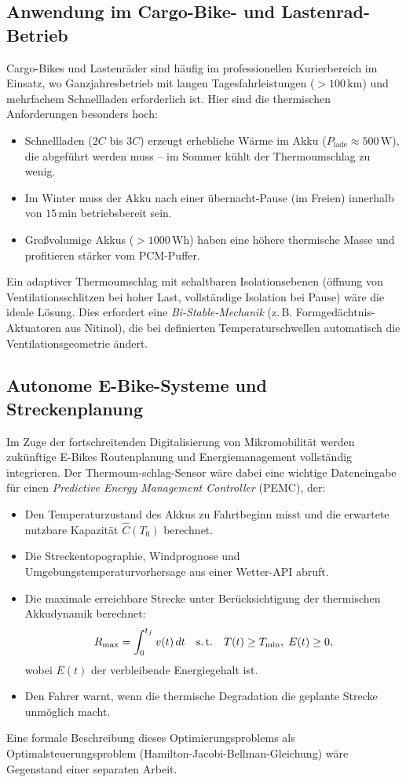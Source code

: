 ﻿\documentclass[a4paper,12pt]{article}
\theoremstyle{definition}
\begin{document}
\subsection{Anwendung im Cargo-Bike- und Lastenrad-Betrieb}

Cargo-Bikes und Lastenr\"ader sind h\"aufig im professionellen Kurierbereich im Einsatz, wo Ganzjahresbetrieb mit langen Tagesfahrleistungen ($> 100\,\mathrm{km}$) und mehrfachem Schnellladen erforderlich ist. Hier sind die thermischen Anforderungen besonders hoch:
\begin{itemize}
  \item Schnellladen ($2C$ bis $3C$) erzeugt erhebliche W\"arme im Akku ($P_\mathrm{lade} \approx 500\,\mathrm{W}$), die abgef\"uhrt werden muss -- im Sommer k\"uhlt der Thermoumschlag zu wenig.
  \item Im Winter muss der Akku nach einer \"ubernacht-Pause (im Freien) innerhalb von $15\,\mathrm{min}$ betriebsbereit sein.
  \item Gro\ss{}volumige Akkus ($> 1000\,\mathrm{Wh}$) haben eine h\"ohere thermische Masse und profitieren st\"arker vom PCM-Puffer.
\end{itemize}
Ein adaptiver Thermoumschlag mit schaltbaren Isolationsebenen (\"offnung von Ventilationsschlitzen bei hoher Last, vollst\"andige Isolation bei Pause) w\"are die ideale L\"osung. Dies erfordert eine \emph{Bi-Stable-Mechanik} (z.\,B. Formged\"achtnis-Aktuatoren aus Nitinol), die bei definierten Temperaturschwellen automatisch die Ventilationsgeometrie \"andert.

\subsection{Autonome E-Bike-Systeme und Streckenplanung}

Im Zuge der fortschreitenden Digitalisierung von Mikromobilit\"at werden zuk\"unftige E-Bikes Routenplanung und Energiemanagement vollst\"andig integrieren. Der Thermoum-\newline schlag-Sensor w\"are dabei eine wichtige Dateneingabe f\"ur einen \emph{Predictive Energy Management Controller} (PEMC), der:
\begin{itemize}
  \item Den Temperaturzustand des Akkus zu Fahrtbeginn misst und die erwartete nutzbare Kapazit\"at $\hat{C}(T_0)$ berechnet.
  \item Die Streckentopographie, Windprognose und Umgebungstemperaturvorhersage aus einer Wetter-API abruft.
  \item Die maximale erreichbare Strecke unter Ber\"ucksichtigung der thermischen Akkudynamik berechnet:
  \[
    R_\mathrm{max} = \int_0^{t_f} v(t)\,dt \quad \text{s.\,t.} \quad T(t) \geq T_\mathrm{min},\; E(t) \geq 0,
  \]
  wobei $E(t)$ der verbleibende Energiegehalt ist.
  \item Den Fahrer warnt, wenn die thermische Degradation die geplante Strecke unm\"oglich macht.
\end{itemize}
Eine formale Beschreibung dieses Optimierungsproblems als Optimalsteuerungsproblem (Hamilton-Jacobi-Bellman-Gleichung) w\"are Gegenstand einer separaten Arbeit.
\end{document}
